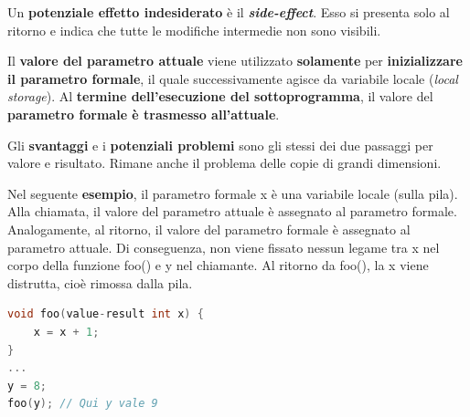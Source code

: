 \documentclass[a4paper]{article}
\begin{document}
	\noindent
	Un \textbf{potenziale effetto indesiderato} è il \emph{\textbf{side-effect}}. Esso si presenta solo al ritorno e indica che tutte le modifiche intermedie non sono visibili.\newline
	
	\noindent
	Il \textbf{valore del parametro attuale} viene utilizzato \textbf{solamente} per \textbf{inizializzare il parametro formale}, il quale successivamente agisce da variabile locale (\emph{local storage}). Al \textbf{termine dell'esecuzione del sottoprogramma}, il valore del \textbf{parametro formale è trasmesso all'attuale}.\newline
	
	\noindent
	Gli \textcolor{Red3}{\textbf{svantaggi}} e i \textcolor{Red3}{\textbf{potenziali problemi}} sono gli stessi dei due passaggi per valore e risultato. Rimane anche il problema delle copie di grandi dimensioni.\newline
	
	\noindent
	Nel seguente \textcolor{Green4}{\textbf{esempio}}, il parametro formale \textsf{x} è una variabile locale (sulla pila). Alla chiamata, il valore del parametro attuale è assegnato al parametro formale. Analogamente, al ritorno, il valore del parametro formale è assegnato al parametro attuale. Di conseguenza, non viene fissato nessun legame tra \textsf{x} nel corpo della funzione \textsf{foo()} e \textsf{y} nel chiamante. Al ritorno da \textsf{foo()}, la \textsf{x} viene distrutta, cioè rimossa dalla pila.
	\begin{lstlisting}[language=C]
void foo(value-result int x) {
	x = x + 1;
}
...
y = 8;
foo(y); // Qui y vale 9
	\end{lstlisting}\newpage
	
\end{document}
